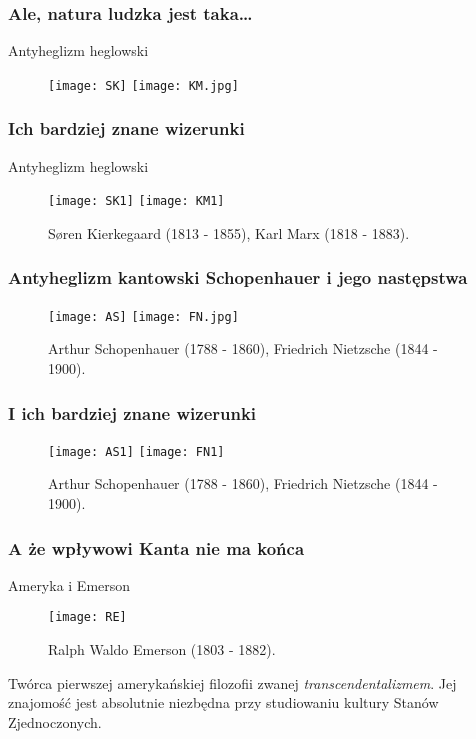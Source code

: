 \begin{frame}
\frametitle{Ale, natura ludzka jest taka\ldots}
\begin{block}{Antyheglizm heglowski}
\begin{figure}
\centering
\texttt{[image: SK]}
\texttt{[image: KM.jpg]}
\end{figure}
\end{block}
\end{frame}

\begin{frame}
\frametitle{Ich bardziej znane wizerunki}
\begin{block}{Antyheglizm heglowski}
\begin{figure}
\centering
\texttt{[image: SK1]}
\texttt{[image: KM1]}
\caption{Søren Kierkegaard (1813 - 1855), Karl Marx (1818 - 1883).}
\end{figure}
\end{block}
\end{frame}

\begin{frame}
\frametitle{Antyheglizm kantowski Schopenhauer i jego następstwa}
\begin{block}{}
\begin{figure}
\centering
\texttt{[image: AS]}
\texttt{[image: FN.jpg]}
\pause
\caption{Arthur Schopenhauer (1788 - 1860), Friedrich Nietzsche (1844 - 1900).}
\end{figure}
\end{block}
\end{frame}

\begin{frame}
\frametitle{I ich bardziej znane wizerunki}
\begin{block}{}
\begin{figure}
\centering
\texttt{[image: AS1]}
\texttt{[image: FN1]}
\caption{Arthur Schopenhauer (1788 - 1860), Friedrich Nietzsche (1844 - 1900).}
\end{figure}
\end{block}
\end{frame}

\begin{frame}
\frametitle{A że wpływowi Kanta nie ma końca}
\begin{block}{Ameryka i Emerson}
\begin{figure}
\centering
\texttt{[image: RE]}
\caption{Ralph Waldo Emerson (1803 - 1882).}
\end{figure}
\end{block}

\begin{block}{}
Twórca pierwszej amerykańskiej filozofii zwanej \emph{transcendentalizmem}. Jej znajomość jest absolutnie niezbędna przy studiowaniu kultury Stanów Zjednoczonych.
\end{block}
\end{frame}


